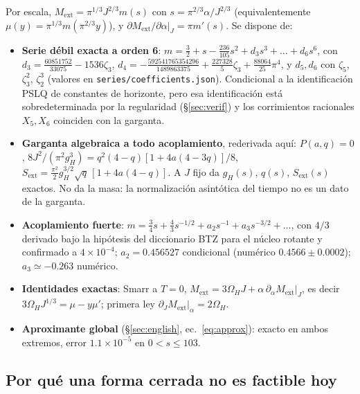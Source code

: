 \documentclass[10pt,a4paper]{article}
\newcommand{\code}[1]{\texttt{#1}}
\newcommand{\ext}{\mathrm{ext}}
\begin{document}
Por escala, $M_\ext=\pi^{1/3}J^{2/3}m(s)$ con $s=\pi^{2/3}\alpha/J^{2/3}$ (equivalentemente
$\mu(y)=\pi^{1/3}m(\pi^{2/3}y)$), y $\partial M_\ext/\partial\alpha|_J=\pi m'(s)$. Se dispone de:
\begin{itemize}
\item \textbf{Serie débil exacta a orden 6}:
 $m=\tfrac32+s-\tfrac{236}{105}s^2+d_3s^3+\dots+d_6s^6$, con $d_3=\tfrac{60851752}{33075}-1536\zeta_3$,
 $d_4=-\tfrac{592541765354296}{1489863375}+\tfrac{227328}5\zeta_3+\tfrac{88064}{25}\pi^4$, y $d_5,d_6$
 con $\zeta_5$, $\zeta_3^2$, $\zeta_2^3$ (valores en \code{series/coefficients.json}). Condicional a
 la identificación PSLQ de constantes de horizonte, pero esa identificación está sobredeterminada por
 la regularidad (\S\ref{sec:verif}) y los corrimientos racionales $X_5,X_6$ coinciden con la garganta.
\item \textbf{Garganta algebraica a todo acoplamiento}, rederivada aquí: $P(a,q)=0$,
 $8J^2/(\pi^2g_H^3)=q^2(4-q)[1+4a(4-3q)]/8$, $S_\ext=\tfrac{\pi^2}2g_H^{3/2}\sqrt q\,[1+4a(4-q)]$.
 A $J$ fijo da $g_H(s)$, $q(s)$, $S_\ext(s)$ exactos. No da la masa: la normalización asintótica
 del tiempo no es un dato de la garganta.
\item \textbf{Acoplamiento fuerte}: $m=\tfrac34s+\tfrac43s^{-1/2}+a_2s^{-1}+a_3s^{-3/2}+\dots$, con
 $4/3$ derivado bajo la hipótesis del diccionario BTZ para el núcleo rotante y confirmado a
 $4\times10^{-4}$; $a_2=0.456527$ condicional (numérico $0.4566\pm0.0002$); $a_3\simeq-0.263$ numérico.
\item \textbf{Identidades exactas}: Smarr a $T=0$, $M_\ext=3\Omega_HJ+\alpha\,\partial_\alpha M_\ext|_J$,
 es decir $3\Omega_HJ^{1/3}=\mu-y\mu'$; primera ley $\partial_JM_\ext|_\alpha=2\Omega_H$.
\item \textbf{Aproximante global} (\S\ref{sec:english}, ec.~\eqref{eq:approx}): exacto en ambos
 extremos, error $1.1\times10^{-5}$ en $0<s\le103$.
\end{itemize}

\subsection{Por qué una forma cerrada no es factible hoy}
\end{document}
